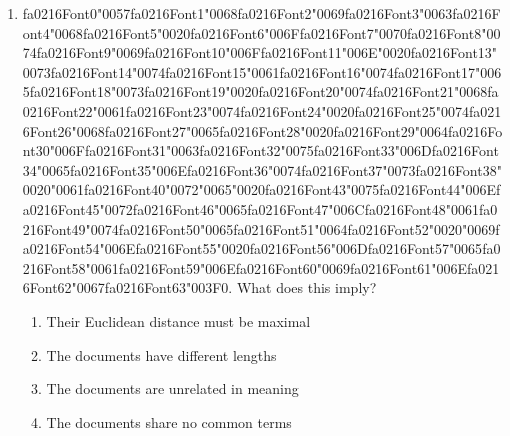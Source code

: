 \documentclass[12pt]{article}
\begin{document}
\begin{enumerate}[label=Q\arabic*.]
 \item {\csname fa0216Font0\endcsname\char"0057}{\csname fa0216Font1\endcsname\char"0068}{\csname fa0216Font2\endcsname\char"0069}{\csname fa0216Font3\endcsname\char"0063}{\csname fa0216Font4\endcsname\char"0068}{\csname fa0216Font5\endcsname\char"0020}{\csname fa0216Font6\endcsname\char"006F}{\csname fa0216Font7\endcsname\char"0070}{\csname fa0216Font8\endcsname\char"0074}{\csname fa0216Font9\endcsname\char"0069}{\csname fa0216Font10\endcsname\char"006F}{\csname fa0216Font11\endcsname\char"006E}{\char"0020}{\csname fa0216Font13\endcsname\char"0073}{\csname fa0216Font14\endcsname\char"0074}{\csname fa0216Font15\endcsname\char"0061}{\csname fa0216Font16\endcsname\char"0074}{\csname fa0216Font17\endcsname\char"0065}{\csname fa0216Font18\endcsname\char"0073}{\csname fa0216Font19\endcsname\char"0020}{\csname fa0216Font20\endcsname\char"0074}{\csname fa0216Font21\endcsname\char"0068}{\csname fa0216Font22\endcsname\char"0061}{\csname fa0216Font23\endcsname\char"0074}{\csname fa0216Font24\endcsname\char"0020}{\csname fa0216Font25\endcsname\char"0074}{\csname fa0216Font26\endcsname\char"0068}{\csname fa0216Font27\endcsname\char"0065}{\csname fa0216Font28\endcsname\char"0020}{\csname fa0216Font29\endcsname\char"0064}{\csname fa0216Font30\endcsname\char"006F}{\csname fa0216Font31\endcsname\char"0063}{\csname fa0216Font32\endcsname\char"0075}{\csname fa0216Font33\endcsname\char"006D}{\csname fa0216Font34\endcsname\char"0065}{\csname fa0216Font35\endcsname\char"006E}{\csname fa0216Font36\endcsname\char"0074}{\csname fa0216Font37\endcsname\char"0073}{\csname fa0216Font38\endcsname\char"0020}{\char"0061}{\csname fa0216Font40\endcsname\char"0072}{\char"0065}{\char"0020}{\csname fa0216Font43\endcsname\char"0075}{\csname fa0216Font44\endcsname\char"006E}{\csname fa0216Font45\endcsname\char"0072}{\csname fa0216Font46\endcsname\char"0065}{\csname fa0216Font47\endcsname\char"006C}{\csname fa0216Font48\endcsname\char"0061}{\csname fa0216Font49\endcsname\char"0074}{\csname fa0216Font50\endcsname\char"0065}{\csname fa0216Font51\endcsname\char"0064}{\csname fa0216Font52\endcsname\char"0020}{\char"0069}{\csname fa0216Font54\endcsname\char"006E}{\csname fa0216Font55\endcsname\char"0020}{\csname fa0216Font56\endcsname\char"006D}{\csname fa0216Font57\endcsname\char"0065}{\csname fa0216Font58\endcsname\char"0061}{\csname fa0216Font59\endcsname\char"006E}{\csname fa0216Font60\endcsname\char"0069}{\csname fa0216Font61\endcsname\char"006E}{\csname fa0216Font62\endcsname\char"0067}{\csname fa0216Font63\endcsname\char"003F}$0$. What does this imply?
 \begin{enumerate}[label=(\Alph*)]
     \item Their Euclidean distance must be maximal
     \item The documents have different lengths
     \item The documents are unrelated in meaning
     \item The documents share no common terms
 \end{enumerate}
 

\end{enumerate}
\end{document}
